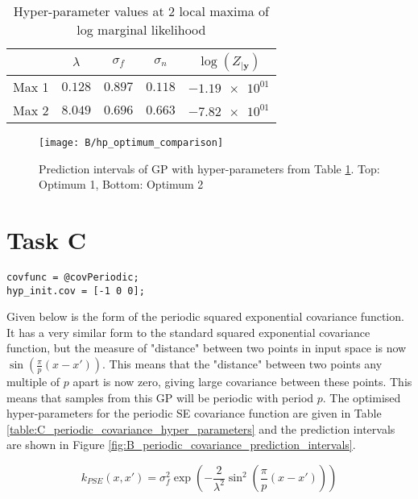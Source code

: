\documentclass[11pt, twocolumn]{article}
\begin{document}
\begin{table}[h]
    \centering
    \small
    \begin{tabular}{|c|c|c|c|c|}
        \hline
         & $\lambda$ & $\sigma_f$ & $\sigma_n$ & $\log(Z_{|\textbf{y}})$ \\
        \hline
        Max 1 & $0.128$ & $0.897$ & $0.118$ & $\num{-1.19e+01}$ \\ 
        Max 2 & $8.049$ & $0.696$ & $0.663$ & $\num{-7.82e+01}$ \\ 
        \hline
    \end{tabular}
    \caption{Hyper-parameter values at 2 local maxima of log marginal likelihood}
    \label{table:B_hyper_parameter_optima}
\end{table}

\begin{figure}[h]
    \centering
    \texttt{[image: B/hp\_optimum\_comparison]}
    \caption{Prediction intervals of GP with hyper-parameters from Table \ref{table:B_hyper_parameter_optima}. Top: Optimum 1, Bottom: Optimum 2}
    \label{fig:B_hyper_parameter_optimum_comparison}
\end{figure}

\section{Task C}
\begin{lstlisting}[caption=Code to use periodic SE covariance. Training and prediction code same as Listing \ref{lst:A}, captionpos=b, basicstyle=\small, frame=tlrb]
covfunc = @covPeriodic;
hyp_init.cov = [-1 0 0];
\end{lstlisting}
\label{lst:C}

Given below is the form of the periodic squared exponential covariance function. It has a very similar form to the standard squared exponential covariance function, but the measure of "distance" between two points in input space is now $\sin(\frac{\pi}{p}(x-x'))$. This means that the "distance" between two points any multiple of $p$ apart is now zero, giving large covariance between these points. This means that samples from this GP will be periodic with period $p$. The optimised hyper-parameters for the periodic SE covariance function are given in Table \ref{table:C_periodic_covariance_hyper_parameters} and the prediction intervals are shown in Figure \ref{fig:B_periodic_covariance_prediction_intervals}.


\[k_{PSE}(x,x') = \sigma_f^2 \exp(-\frac{2}{\lambda^2}\sin^2(\frac{\pi}{p}(x-x')))\]
\end{document}
